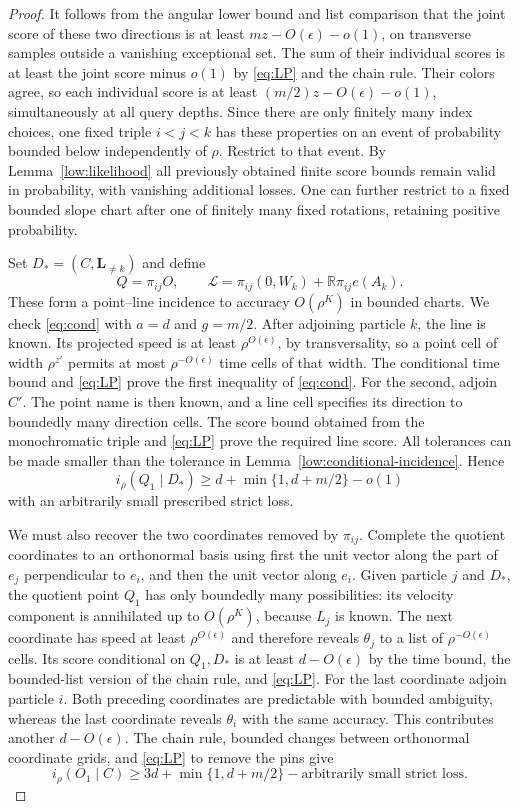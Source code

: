 \begin{proof}
It follows from the angular lower bound and list comparison that the
joint score of these two directions is at least
$mz-O(\epsilon)-o(1)$, on transverse samples outside a vanishing
exceptional set. The sum of their individual scores is at least the
joint score minus $o(1)$ by \eqref{eq:LP} and the chain rule.
Their colors agree, so each individual score is at least
$(m/2)z-O(\epsilon)-o(1)$, simultaneously at all query depths.
Since there are only finitely many index choices, one fixed triple
$i<j<k$ has these properties on an event of probability bounded below
independently of $\rho$. Restrict to that event. By
Lemma~\ref{low:likelihood} all previously obtained finite score bounds
remain valid in probability, with vanishing additional losses.
One can further restrict to a fixed bounded slope chart after one of
finitely many fixed rotations, retaining positive probability.

Set $D_*=(C,\mathbf L_{\ne k})$ and define
\[
 Q=\pi_{ij}O,\qquad
 \mathcal L=\pi_{ij}(0,W_k)+\mathbb R\pi_{ij}e(A_k).
\]
These form a point--line incidence to accuracy $O(\rho^K)$ in bounded
charts. We check \eqref{eq:cond} with $a=d$ and $g=m/2$.
After adjoining particle $k$, the line is known. Its projected speed
is at least $\rho^{O(\epsilon)}$, by transversality, so a point cell
of width $\rho^{z'}$ permits at most $\rho^{-O(\epsilon)}$ time
cells of that width. The conditional time bound and
\eqref{eq:LP} prove the first inequality of \eqref{eq:cond}.
For the second, adjoin $C'$. The point name is then known, and a line
cell specifies its direction to boundedly many direction cells.
The score bound obtained from the monochromatic triple and
\eqref{eq:LP} prove the required line score. All tolerances can be
made smaller than the tolerance in
Lemma~\ref{low:conditional-incidence}. Hence
\[
 i_\rho(Q_1\mid D_*)
 \geq d+\min\{1,d+m/2\}-o(1)
\]
with an arbitrarily small prescribed strict loss.

We must also recover the two coordinates removed by $\pi_{ij}$.
Complete the quotient coordinates to an orthonormal basis using first
the unit vector along the part of $e_j$ perpendicular to $e_i$, and
then the unit vector along $e_i$. Given particle $j$ and $D_*$, the
quotient point $Q_1$ has only boundedly many possibilities: its
velocity component is annihilated up to $O(\rho^K)$, because $L_j$
is known. The next coordinate has speed at least
$\rho^{O(\epsilon)}$ and therefore reveals $\theta_j$ to a list of
$\rho^{-O(\epsilon)}$ cells. Its score conditional on $Q_1,D_*$ is
at least $d-O(\epsilon)$ by the time bound, the bounded-list version
of the chain rule, and \eqref{eq:LP}. For the last coordinate adjoin
particle $i$. Both preceding coordinates are predictable with bounded
ambiguity, whereas the last coordinate reveals $\theta_i$ with the
same accuracy. This contributes another $d-O(\epsilon)$.
The chain rule, bounded changes between orthonormal coordinate grids,
and \eqref{eq:LP} to remove the pins give
\[
 i_\rho(O_1\mid C)
 \geq 3d+\min\{1,d+m/2\}-\text{arbitrarily small strict loss}.
\]


\end{proof}
